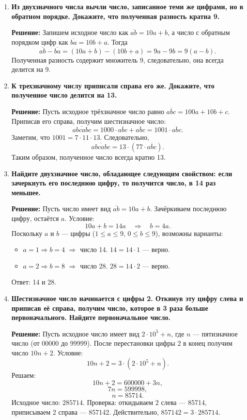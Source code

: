\documentclass[12pt, a4paper]{article}
\begin{document}
\begin{enumerate}[label=\arabic*., wide=0pt, leftmargin=*]
\item \textbf{Из двухзначного числа вычли число, записанное теми же цифрами, но в обратном порядке. Докажите, что полученная разность кратна 9.}

\textbf{Решение:}
Запишем исходное число как \(\overline{ab} = 10a + b\), а число с обратным порядком цифр как \(\overline{ba} = 10b + a\). Тогда
\[
\overline{ab} - \overline{ba} = (10a + b) - (10b + a) = 9a - 9b = 9(a - b).
\]
Полученная разность содержит множитель 9, следовательно, она всегда делится на 9.

\item \textbf{К трехзначному числу приписали справа его же. Докажите, что полученное число делится на 13.}

\textbf{Решение:}
Пусть исходное трёхзначное число равно \(\overline{abc} = 100a + 10b + c\). Приписав его справа, получим шестизначное число:
\[
\overline{abcabc} = 1000 \cdot \overline{abc} + \overline{abc} = 1001 \cdot \overline{abc}.
\]
Заметим, что \(1001 = 7 \cdot 11 \cdot 13\). Следовательно,
\[
\overline{abcabc} = 13 \cdot (77 \cdot \overline{abc}).
\]
Таким образом, полученное число всегда кратно 13.

\item \textbf{Найдите двухзначное число, обладающее следующим свойством: если зачеркнуть его последнюю цифру, то получится число, в 14 раз меньшее.}

\textbf{Решение:}
Пусть число имеет вид \(\overline{ab} = 10a + b\). Зачёркиваем последнюю цифру, остаётся \(a\). Условие:
\[
10a + b = 14a \quad\Rightarrow\quad b = 4a.
\]
Поскольку \(a\) и \(b\) — цифры (\(1 \le a \le 9\), \(0 \le b \le 9\)), возможны варианты:
\begin{itemize}
\item \(a = 1 \Rightarrow b = 4\) \(\Rightarrow\) число 14. \(14 = 14 \cdot 1\) — верно.
\item \(a = 2 \Rightarrow b = 8\) \(\Rightarrow\) число 28. \(28 = 14 \cdot 2\) — верно.
\end{itemize}
Ответ: 14 и 28.

\item \textbf{Шестизначное число начинается с цифры 2. Откинув эту цифру слева и приписав её справа, получим число, которое в 3 раза больше первоначального. Найдите первоначальное число.}

\textbf{Решение:}
Пусть исходное число имеет вид \(2 \cdot 10^5 + n\), где \(n\) — пятизначное число (от 00000 до 99999). После перестановки цифры 2 в конец получим число \(10n + 2\). Условие:
\[
10n + 2 = 3 \cdot (2 \cdot 10^5 + n).
\]
Решаем:
\[
10n + 2 = 600000 + 3n,
\]
\[
7n = 599998,
\]
\[
n = 85714.
\]
Исходное число: \(285714\). 
Проверка: откидываем 2 слева — 85714, приписываем 2 справа — 857142. Действительно, \(857142 = 3 \cdot 285714\).


\end{enumerate}
\end{document}

